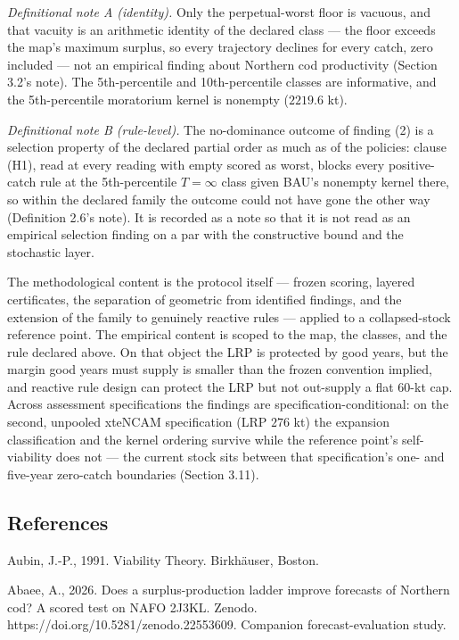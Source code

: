 \documentclass[11pt]{article}
\begin{document}
\emph{Definitional note A (identity).} Only the perpetual-worst floor is
vacuous, and that vacuity is an arithmetic identity of the declared
class --- the floor exceeds the map's maximum surplus, so every
trajectory declines for every catch, zero included --- not an empirical
finding about Northern cod productivity (Section 3.2's note). The
5th-percentile and 10th-percentile classes are informative, and the
5th-percentile moratorium kernel is nonempty (\(2219.6\) kt).

\emph{Definitional note B (rule-level).} The no-dominance outcome of
finding (2) is a selection property of the declared partial order as
much as of the policies: clause (H1), read at every reading with empty
scored as worst, blocks every positive-catch rule at the 5th-percentile
\(T=\infty\) class given BAU's nonempty kernel there, so within the
declared family the outcome could not have gone the other way
(Definition 2.6's note). It is recorded as a note so that it is not read
as an empirical selection finding on a par with the constructive bound
and the stochastic layer.

The methodological content is the protocol itself --- frozen scoring,
layered certificates, the separation of geometric from identified
findings, and the extension of the family to genuinely reactive rules
--- applied to a collapsed-stock reference point. The empirical content
is scoped to the map, the classes, and the rule declared above. On that
object the LRP is protected by good years, but the margin good years
must supply is smaller than the frozen convention implied, and reactive
rule design can protect the LRP but not out-supply a flat 60-kt cap.
Across assessment specifications the findings are
specification-conditional: on the second, unpooled xteNCAM specification
(LRP \(276\) kt) the expansion classification and the kernel ordering
survive while the reference point's self-viability does not --- the
current stock sits between that specification's one- and five-year
zero-catch boundaries (Section 3.11).

\subsection{References}\label{references}

Aubin, J.-P., 1991. Viability Theory. Birkh\"auser, Boston.

Abaee, A., 2026. Does a surplus-production ladder improve forecasts of
Northern cod? A scored test on NAFO 2J3KL. Zenodo.
https://doi.org/10.5281/zenodo.22553609. Companion forecast-evaluation
study.
\end{document}

